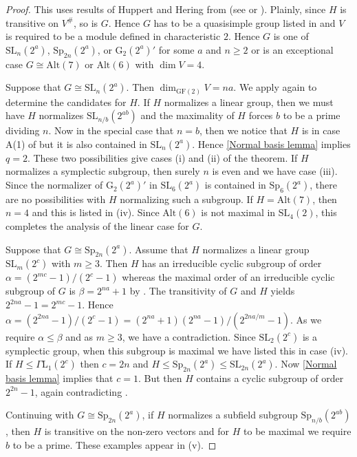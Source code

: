 \documentclass[12pt]{amsart}
\theoremstyle{remark}
\theoremstyle{notation}
\theoremstyle{definition}
\newcommand{\GF}{\mathrm{GF}}
\newcommand{\Sp}{\mathrm{Sp}}
\newcommand{\SL}{\mathrm{SL}}
\newcommand{\0}{\emptyset}
\newcommand{\Alt}{\mathrm{Alt}}
\begin{document}
\begin{proof}
This uses results of Huppert and Hering
 from \cite{Huppert, Hering} (see \cite[Section 7]{HBIII} or \cite[Appendix 1]{LiebeckAffine}).  Plainly, since $H$ is transitive on $V^\#$, so is $G$.  Hence $G$ has to be a quasisimple group listed in  \cite[Appendix 1]{LiebeckAffine} and $V$ is required to be a module defined in characteristic $2$.  Hence $G$ is one of $\SL_n(2^a)$, $\Sp_{2n}(2^a)$, or $\mathrm G_2(2^a)'$ for some $a$ and $n \ge 2$ or is an exceptional case $G\cong \Alt(7)$ or $\Alt(6)$ with $\dim V=4$.


 Suppose that $G \cong \SL_n(2^a)$. Then $\dim_{\GF(2)} V= na$. We apply \cite[Appendix 1]{LiebeckAffine} again to determine the candidates for $H$. If $H$ normalizes a linear group, then we must have $H$ normalizes $\SL_{n/b}(2^{ab})$ and the maximality of $H$ forces $b$ to be a prime dividing $n$. Now in the special case that $n=b$, then we notice that $H$ is in case A(1)  of \cite[Appendix 1]{LiebeckAffine} but it is also contained in $\SL_n(2^a)$. Hence \cref{Normal basis lemma} implies $q=2$. These two possibilities give cases (i) and (ii) of the theorem. If $H$ normalizes a symplectic subgroup, then surely $n$ is even and we have case (iii). Since the normalizer of
$\mathrm G_2(2^a)'$ in $\SL_6(2^a)$ is contained in $\Sp_6(2^a)$, there are no possibilities with $H$ normalizing such a subgroup.  If $H = \Alt(7)$, then $n=4$ and this is listed in (iv). Since $\Alt(6)$ is not maximal in $\SL_4(2)$, this completes the analysis of the linear case for $G$.

Suppose that $G\cong \Sp_{2n}(2^a)$. Assume that $H$ normalizes a linear group $\SL_m(2^c)$ with $m \ge 3$.   Then $H$ has an irreducible cyclic subgroup of order $  \alpha=(2^{mc}-1)/(2^c-1)$ whereas the maximal order of an irreducible  cyclic subgroup of $G$ is $\beta=2^{na}+1$ by \cite[Satz 5]{HuppertSinger}. The transitivity of $G$ and $H$ yields $2^{2na}-1= 2^{mc}-1$.
Hence $\alpha = (2^{2na}-1)/(2^c-1)= (2^{na}+1)(2^{na}-1)/(2^{2na/m}-1)$. As we require $\alpha \le \beta$ and as $m\ge 3$, we have a contradiction. Since $\SL_2(2^c)$ is a symplectic group, when this subgroup is maximal we have listed this in case (iv). If $H \le \Gamma\mathrm L_1(2^c)$ then  $c=2n$ and $H \le \Sp_{2n}(2^a) \le \SL_{2n}(2^a)$. Now \cref{Normal basis lemma} implies that $c=1$. But then $H$ contains a cyclic subgroup of order $2^{2n}-1$, again contradicting  \cite[Satz 5]{HuppertSinger}.

Continuing with $G\cong \Sp_{2n}(2^a)$, if $H$ normalizes a subfield  subgroup $\Sp_{n/b}(2^{ab})$, then $H$ is transitive on the non-zero vectors and for $H$ to be maximal we require $b$ to be a prime. These examples appear  in (v).


\end{proof}
\end{document}
